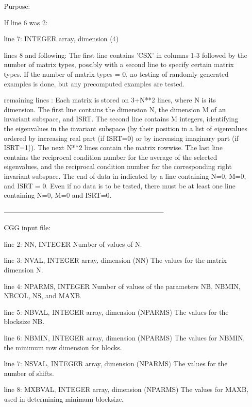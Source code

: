 \begin{DoxyParagraph}{Purpose\+: }
\begin{DoxyVerb}
 If line 6 was 2:

 line 7:  INTEGER array, dimension (4)

 lines 8 and following: The first line contains 'CSX' in columns 1-3
          followed by the number of matrix types, possibly with
          a second line to specify certain matrix types.
          If the number of matrix types = 0, no testing of randomly
          generated examples is done, but any precomputed examples
          are tested.

 remaining lines : Each matrix is stored on 3+N**2 lines, where N is
          its dimension. The first line contains the dimension N, the
          dimension M of an invariant subspace, and ISRT. The second
          line contains M integers, identifying the eigenvalues in the
          invariant subspace (by their position in a list of
          eigenvalues ordered by increasing real part (if ISRT=0) or
          by increasing imaginary part (if ISRT=1)). The next N**2
          lines contain the matrix rowwise. The last line contains the
          reciprocal condition number for the average of the selected
          eigenvalues, and the reciprocal condition number for the
          corresponding right invariant subspace. The end of data in
          indicated by a line containing N=0, M=0, and ISRT = 0.  Even
          if no data is to be tested, there must be at least one line
          containing N=0, M=0 and ISRT=0.

-----------------------------------------------------------------------

 CGG input file:

 line 2:  NN, INTEGER
          Number of values of N.

 line 3:  NVAL, INTEGER array, dimension (NN)
          The values for the matrix dimension N.

 line 4:  NPARMS, INTEGER
          Number of values of the parameters NB, NBMIN, NBCOL, NS, and
          MAXB.

 line 5:  NBVAL, INTEGER array, dimension (NPARMS)
          The values for the blocksize NB.

 line 6:  NBMIN, INTEGER array, dimension (NPARMS)
          The values for NBMIN, the minimum row dimension for blocks.

 line 7:  NSVAL, INTEGER array, dimension (NPARMS)
          The values for the number of shifts.

 line 8:  MXBVAL, INTEGER array, dimension (NPARMS)
          The values for MAXB, used in determining minimum blocksize.


\end{DoxyVerb}
\end{DoxyParagraph}
